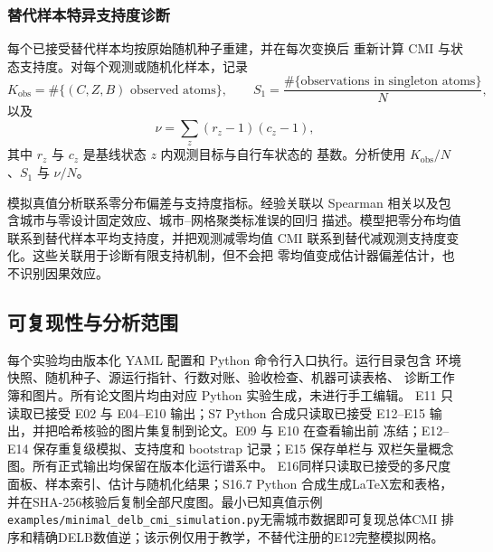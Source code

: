 \subsubsection{替代样本特异支持度诊断}
\label{subsec:e13_support_methods}

每个已接受替代样本均按原始随机种子重建，并在每次变换后
重新计算 CMI 与状态支持度。对每个观测或随机化样本，记录
\begin{equation}
K_{\mathrm{obs}}
=\#\{(C,Z,B)\text{ observed atoms}\},
\qquad
S_1
=\frac{\#\{\text{observations in singleton atoms}\}}{N},
\label{eq:e13_support_metrics}
\end{equation}
以及
\begin{equation}
\nu=\sum_z(r_z-1)(c_z-1),
\label{eq:e13_effective_df}
\end{equation}
其中 \(r_z\) 与 \(c_z\) 是基线状态 \(z\) 内观测目标与自行车状态的
基数。分析使用 \(K_{\mathrm{obs}}/N\)、\(S_1\) 与 \(\nu/N\)。

模拟真值分析联系零分布偏差与支持度指标。经验关联以
Spearman 相关以及包含城市与零设计固定效应、城市--网格聚类标准误的回归
描述。模型把零分布均值联系到替代样本平均支持度，并把观测减零均值 CMI
联系到替代减观测支持度变化。这些关联用于诊断有限支持机制，但不会把
零均值变成估计器偏差估计，也不识别因果效应。

\subsection{可复现性与分析范围}
\label{subsec:reproducibility}

每个实验均由版本化 YAML 配置和 Python 命令行入口执行。运行目录包含
环境快照、随机种子、源运行指针、行数对账、验收检查、机器可读表格、
诊断工作簿和图片。所有论文图片均由对应 Python 实验生成，未进行手工编辑。
E11 只读取已接受 E02 与 E04--E10 输出；S7 Python 合成只读取已接受
E12--E15 输出，并把哈希核验的图片集复制到论文。E09 与 E10 在查看输出前
冻结；E12--E14 保存重复级模拟、支持度和 bootstrap 记录；E15 保存单栏与
双栏矢量概念图。所有正式输出均保留在版本化运行谱系中。
E16同样只读取已接受的多尺度面板、样本索引、估计与随机化结果；S16.7 Python
合成生成LaTeX宏和表格，并在SHA-256核验后复制全部尺度图。最小已知真值示例
\texttt{examples/minimal\_delb\_cmi\_simulation.py}无需城市数据即可复现总体CMI
排序和精确DELB数值逆；该示例仅用于教学，不替代注册的E12完整模拟网格。
